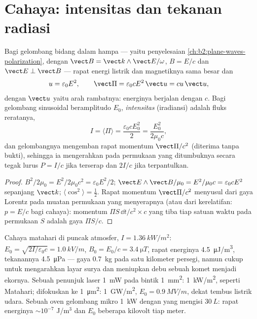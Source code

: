 \section{Cahaya: intensitas dan tekanan radiasi}

\begin{proposition}\label{prop:b2:poynting-vector:wave}
Bagi gelombang bidang dalam hampa --- yaitu penyelesaian \cref{ch:b2:plane-waves-polarization},
dengan $\vect B = \vect k\wedge\vect E/\omega$, $B = E/c$ dan $\vect E \perp \vect B$ ---
rapat energi listrik dan magnetiknya sama besar dan
\[
u = \varepsilon_0E^2 , \qquad \vect\Pi = \varepsilon_0cE^2\,\vect u = cu\,\vect u ,
\]
dengan $\vect u$ yaitu arah rambatnya: energinya berjalan dengan $c$.
Bagi gelombang sinusoidal beramplitudo $E_0$, \emph{intensitas}
(iradiansi) adalah fluks reratanya,
\[
I = \langle\Pi\rangle = \frac{\varepsilon_0cE_0^2}2 = \frac{E_0^2}{2\mu_0c} ,
\]
dan gelombangnya mengemban rapat momentum $\vect\Pi/c^2$ (diterima tanpa bukti), sehingga
ia mengerahkan pada permukaan yang ditumbuknya secara tegak lurus
\emph{} $P = I/c$ jika terserap dan $2I/c$ jika terpantulkan.
\end{proposition}

\begin{proof}
$B^2/2\mu_0 = E^2/2\mu_0c^2 = \varepsilon_0E^2/2$; $\vect E\wedge\vect B/\mu_0 = E^2/\mu_0c =
\varepsilon_0cE^2$ sepanjang $\vect k$; $\langle\cos^2\rangle = \tfrac12$. Rapat
momentum $\vect\Pi/c^2$ menyusul dari gaya Lorentz pada muatan
permukaan yang menyerapnya (atau dari kerelatifan: $p = E/c$ bagi cahaya):
momentum $\Pi S\,\dd t/c^2\times c$ yang tiba tiap satuan waktu pada permukaan $S$ adalah
gaya $\Pi S/c$.
\end{proof}

\begin{example}\label{ex:b2:poynting-vector:orders}
Cahaya matahari di puncak atmosfer, $I = \qty{1.36}{kW/m^2}$: $E_0 =
\sqrt{2I/\varepsilon_0c} = \qty{1.0}{kV/m}$, $B_0 = E_0/c = \qty{3.4}{\micro T}$, rapat
energinya \qty{4.5}{\micro J/m^3}, tekanannya \qty{4.5}{\micro Pa} --- gaya \qty{0.7}{kg}
pada satu kilometer persegi, namun cukup untuk mengarahkan layar surya dan
meniupkan debu sebuah komet menjadi ekornya. Sebuah penunjuk laser \qty{1}{mW} pada
bintik \qty{1}{mm^2}: \qty{1}{kW/m^2}, seperti Matahari; difokuskan ke \qty{1}{\micro m^2}:
\qty{1}{GW/m^2}, $E_0 = \qty{0.9}{MV/m}$, dekat tembus listrik udara. Sebuah
oven gelombang mikro \qty{1}{kW} dengan  yang mengisi $\qty{30}{L}$: rapat
energinya $\sim 10^{-7}$ J/m$^3$ dan $E_0$ beberapa kilovolt tiap meter.
\end{example}

